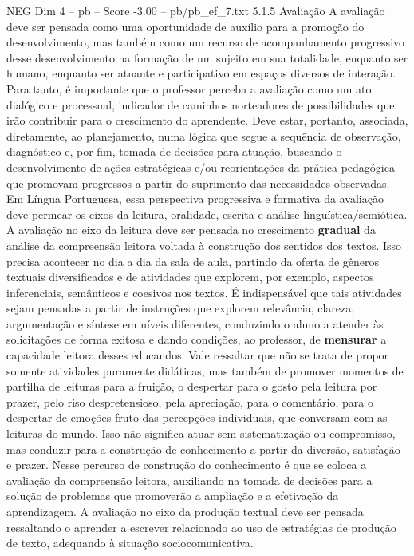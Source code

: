 \begin{textsample}{NEG Dim 4 – pb – Score -3.00 – pb/pb\_ef\_7.txt}  \label{ex:f4_neg_026}
5.1.5 Avaliação A avaliação deve ser pensada como uma oportunidade de auxílio para a promoção do desenvolvimento, mas também como um recurso de acompanhamento progressivo desse desenvolvimento na formação de um sujeito em sua totalidade, enquanto ser humano, enquanto ser atuante e participativo em espaços diversos de interação.
Para tanto, é importante que o professor perceba a avaliação como um ato dialógico e processual, indicador de caminhos norteadores de possibilidades que irão contribuir para o crescimento do aprendente.
Deve estar, portanto, associada, diretamente, ao planejamento, numa lógica que segue a sequência de observação, diagnóstico e, por fim, tomada de decisões para atuação, buscando o desenvolvimento de ações estratégicas e/ou reorientações da prática pedagógica que promovam progressos a partir do suprimento das necessidades observadas.
Em Língua Portuguesa, essa perspectiva progressiva e formativa da avaliação deve permear os eixos da leitura, oralidade, escrita e análise linguística/semiótica.
A avaliação no eixo da leitura deve ser pensada no crescimento \textbf{gradual} da análise da compreensão leitora voltada à construção dos sentidos dos textos.
Isso precisa acontecer no dia a dia da sala de aula, partindo da oferta de gêneros textuais diversificados e de atividades que explorem, por exemplo, aspectos inferenciais, semânticos e coesivos nos textos.
É indispensável que tais atividades sejam pensadas a partir de instruções que explorem relevância, clareza, argumentação e síntese em níveis diferentes, conduzindo o aluno a atender às solicitações de forma exitosa e dando condições, ao professor, de \textbf{mensurar} a capacidade leitora desses educandos.
Vale ressaltar que não se trata de propor somente atividades puramente didáticas, mas também de promover momentos de partilha de leituras para a fruição, o despertar para o gosto pela leitura por prazer, pelo riso despretensioso, pela apreciação, para o comentário, para o despertar de emoções fruto das percepções individuais, que conversam com as leituras do mundo.
Isso não significa atuar sem sistematização ou compromisso, mas conduzir para a construção de conhecimento a partir da diversão, satisfação e prazer.
Nesse percurso de construção do conhecimento é que se coloca a avaliação da compreensão leitora, auxiliando na tomada de decisões para a solução de problemas que promoverão a ampliação e a efetivação da aprendizagem.
A avaliação no eixo da produção textual deve ser pensada ressaltando o aprender a escrever relacionado ao uso de estratégias de produção de texto, adequando à situação sociocomunicativa.

\end{textsample}
